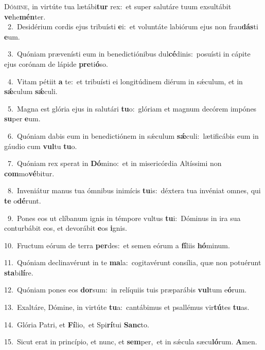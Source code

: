 \lettrine{\initial\textcolor{\initialcolor}{D}}{ómine,} in virtúte tua lætábi\textbf{tur} rex:~\star et super salutáre tuum exsultábit \textbf{ve}\-he\-\textbf{mén}\-ter.\\
{\numbfont\textcolor{\numbcolor}{~2.}}~Desidérium cordis ejus tribuísti \textbf{e}\-i:~\star et voluntáte labiórum ejus non frau\-\textbf{dás}\-ti \textbf{e}\-um.\par
{\numbfont\textcolor{\numbcolor}{~3.}}~Quóniam prævenísti eum in benedictiónibus dul\-\textbf{cé}\-dinis:~\star posuísti in cápite ejus corónam de lápide \textbf{pre}\-ti\-\textbf{ó}\-so.\par
{\numbfont\textcolor{\numbcolor}{~4.}}~Vitam pétiit \textbf{a} te:~\star et tribuísti ei longitúdinem diérum in sǽculum, et in \textbf{sǽ}\-culum \textbf{sǽ}\-culi.\par
{\numbfont\textcolor{\numbcolor}{~5.}}~Magna est glória ejus in salutári \textbf{tu}\-o:~\star glóriam et magnum decórem impónes \textbf{su}\-per \textbf{e}\-um.\par
{\numbfont\textcolor{\numbcolor}{~6.}}~Quóniam dabis eum in benedictiónem in sǽculum \textbf{sǽ}\-culi:~\star lætificábis eum in gáudio cum \textbf{vul}\-tu \textbf{tu}\-o.\par
{\numbfont\textcolor{\numbcolor}{~7.}}~Quóniam rex sperat in \textbf{Dó}\-mino:~\star et in misericórdia Altíssimi non \textbf{com}\-mo\-\textbf{vé}\-bitur.\par
{\numbfont\textcolor{\numbcolor}{~8.}}~Inveniátur manus tua ómnibus inimícis \textbf{tu}\-is:~\star déxtera tua invéniat omnes, qui \textbf{te} o\-\textbf{dé}\-runt.\par
{\numbfont\textcolor{\numbcolor}{~9.}}~Pones eos ut clíbanum ignis in témpore vultus \textbf{tu}\-i:~\star Dóminus in ira sua conturbábit eos, et devorábit \textbf{e}\-os \textbf{i}\-gnis.\par
{\numbfont\textcolor{\numbcolor}{10.}}~Fructum eórum de terra \textbf{per}\-des:~\star et semen eórum a \textbf{fí}\-liis \textbf{hó}\-minum.\par
{\numbfont\textcolor{\numbcolor}{11.}}~Quóniam declinavérunt in te \textbf{ma}\-la:~\star cogitavérunt consília, quæ non potuérunt \textbf{sta}\-bi\-\textbf{lí}\-re.\par
{\numbfont\textcolor{\numbcolor}{12.}}~Quóniam pones eos \textbf{dor}\-sum:~\star in relíquiis tuis præparábis \textbf{vul}\-tum e\-\textbf{ó}\-rum.\par
{\numbfont\textcolor{\numbcolor}{13.}}~Exaltáre, Dómine, in virtúte \textbf{tu}\-a:~\star cantábimus et psallémus vir\-\textbf{tú}\-tes \textbf{tu}\-as.\par
{\numbfont\textcolor{\numbcolor}{14.}}~Glória Patri, et \textbf{Fí}\-lio,~\star et Spi\-\textbf{rí}\-tui \textbf{Sanc}\-to.\par
{\numbfont\textcolor{\numbcolor}{15.}}~Sicut erat in princípio, et nunc, et \textbf{sem}\-per,~\star et in sǽcula sæcu\-\textbf{ló}\-rum. \textbf{A}\-men.\par
